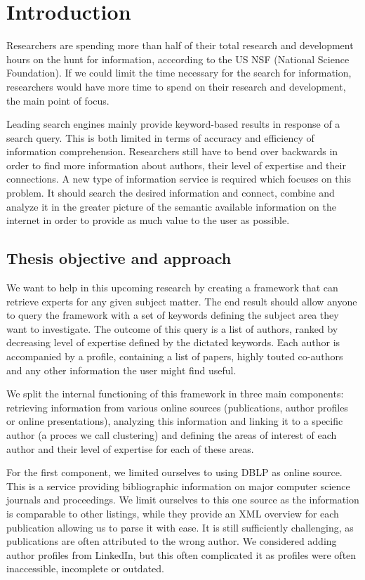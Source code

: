 \chapter{Introduction}

Researchers are spending more than half of their total research and development hours on the hunt for information, acccording to the US NSF (National Science Foundation). If we could limit the time necessary for the search for information, researchers would have more time to spend on their research and development, the main point of focus.

Leading search engines mainly provide keyword-based results in response of a search query. This is both limited in terms of accuracy and efficiency of information comprehension. Researchers still have to bend over backwards in order to find more information about authors, their level of expertise and their connections. A new type of information service is required which focuses on this problem. It should search the desired information and connect, combine and analyze it in the greater picture of the semantic available information on the internet in order to provide as much value to the user as possible.


\section{Thesis objective and approach}

We want to help in this upcoming research by creating a framework that can retrieve experts for any given subject matter. The end result should allow anyone to query the framework with a set of keywords defining the subject area they want to investigate. The outcome of this query is a list of authors, ranked by decreasing level of expertise defined by the dictated keywords. Each author is accompanied by a profile, containing a list of papers, highly touted co-authors and any other information the user might find useful.

We split the internal functioning of this framework in three main components: retrieving information from various online sources (publications, author profiles or online presentations), analyzing this information and linking it to a specific author (a proces we call clustering) and defining the areas of interest of each author and their level of expertise for each of these areas.

For the first component, we limited ourselves to using DBLP \cite{dblp} as online source. This is a service providing bibliographic information on major computer science journals and proceedings. We limit ourselves to this one source as the information is comparable to other listings, while they provide an XML overview for each publication allowing us to parse it with ease. It is still sufficiently challenging, as publications are often attributed to the wrong author. We considered adding author profiles from LinkedIn, but this often complicated it as profiles were often inaccessible, incomplete or outdated.

